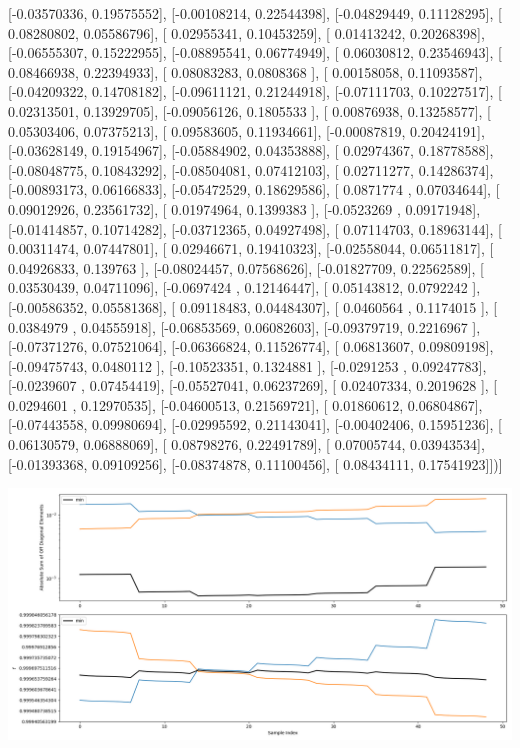 \documentclass{article}
\begin{document}
       [-0.03570336,  0.19575552],
       [-0.00108214,  0.22544398],
       [-0.04829449,  0.11128295],
       [ 0.08280802,  0.05586796],
       [ 0.02955341,  0.10453259],
       [ 0.01413242,  0.20268398],
       [-0.06555307,  0.15222955],
       [-0.08895541,  0.06774949],
       [ 0.06030812,  0.23546943],
       [ 0.08466938,  0.22394933],
       [ 0.08083283,  0.0808368 ],
       [ 0.00158058,  0.11093587],
       [-0.04209322,  0.14708182],
       [-0.09611121,  0.21244918],
       [-0.07111703,  0.10227517],
       [ 0.02313501,  0.13929705],
       [-0.09056126,  0.1805533 ],
       [ 0.00876938,  0.13258577],
       [ 0.05303406,  0.07375213],
       [ 0.09583605,  0.11934661],
       [-0.00087819,  0.20424191],
       [-0.03628149,  0.19154967],
       [-0.05884902,  0.04353888],
       [ 0.02974367,  0.18778588],
       [-0.08048775,  0.10843292],
       [-0.08504081,  0.07412103],
       [ 0.02711277,  0.14286374],
       [-0.00893173,  0.06166833],
       [-0.05472529,  0.18629586],
       [ 0.0871774 ,  0.07034644],
       [ 0.09012926,  0.23561732],
       [ 0.01974964,  0.1399383 ],
       [-0.0523269 ,  0.09171948],
       [-0.01414857,  0.10714282],
       [-0.03712365,  0.04927498],
       [ 0.07114703,  0.18963144],
       [ 0.00311474,  0.07447801],
       [ 0.02946671,  0.19410323],
       [-0.02558044,  0.06511817],
       [ 0.04926833,  0.139763  ],
       [-0.08024457,  0.07568626],
       [-0.01827709,  0.22562589],
       [ 0.03530439,  0.04711096],
       [-0.0697424 ,  0.12146447],
       [ 0.05143812,  0.0792242 ],
       [-0.00586352,  0.05581368],
       [ 0.09118483,  0.04484307],
       [ 0.0460564 ,  0.1174015 ],
       [ 0.0384979 ,  0.04555918],
       [-0.06853569,  0.06082603],
       [-0.09379719,  0.2216967 ],
       [-0.07371276,  0.07521064],
       [-0.06366824,  0.11526774],
       [ 0.06813607,  0.09809198],
       [-0.09475743,  0.0480112 ],
       [-0.10523351,  0.1324881 ],
       [-0.0291253 ,  0.09247783],
       [-0.0239607 ,  0.07454419],
       [-0.05527041,  0.06237269],
       [ 0.02407334,  0.2019628 ],
       [ 0.0294601 ,  0.12970535],
       [-0.04600513,  0.21569721],
       [ 0.01860612,  0.06804867],
       [-0.07443558,  0.09980694],
       [-0.02995592,  0.21143041],
       [-0.00402406,  0.15951236],
       [ 0.06130579,  0.06888069],
       [ 0.08798276,  0.22491789],
       [ 0.07005744,  0.03943534],
       [-0.01393368,  0.09109256],
       [-0.08374878,  0.11100456],
       [ 0.08434111,  0.17541923]])]
\begin{center}
\includegraphics[scale=.9]{report_pickled_controls147/control_dpn_all.png}

\end{center}
\end{document}
